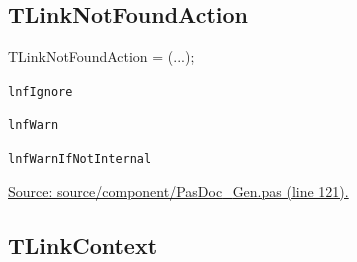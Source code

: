 \documentclass{report}
\newif\ifpdf
\begin{document}
\subsection*{TLinkNotFoundAction}
\fi
\label{PasDoc_Gen-TLinkNotFoundAction}
\begin{list}{}{
\setlength{\itemindent}{0cm}
\setlength{\listparindent}{0cm}
\setlength{\leftmargin}{\evensidemargin}
\addtolength{\leftmargin}{\tmplength}
\settowidth{\labelsep}{X}
\addtolength{\leftmargin}{\labelsep}
\setlength{\labelwidth}{\tmplength}
}
\item[\textbf{Declaration}\hfill]
\ifpdf
\begin{flushleft}
\fi
\begin{ttfamily}
TLinkNotFoundAction = (...);\end{ttfamily}

\ifpdf
\end{flushleft}
\fi

\par
\item[\textbf{Description}]
 \item[\textbf{Values}]
\begin{description}
\item[\texttt{lnfIgnore}] \label{PasDoc_Gen-lnfIgnore}
\index{}
 
\item[\texttt{lnfWarn}] \label{PasDoc_Gen-lnfWarn}
\index{}
 
\item[\texttt{lnfWarnIfNotInternal}] \label{PasDoc_Gen-lnfWarnIfNotInternal}
\index{}
 
\end{description}
\par
\href{https://github.com/pasdoc/pasdoc/blob/master/source/component/PasDoc_Gen.pas#L121}{Source: source/component/PasDoc{\_}Gen.pas (line 121).}

\end{list}
\ifpdf
\subsection*{\large{\textbf{TLinkContext}}\normalsize\hspace{1ex}\hrulefill}
\else
\end{document}
